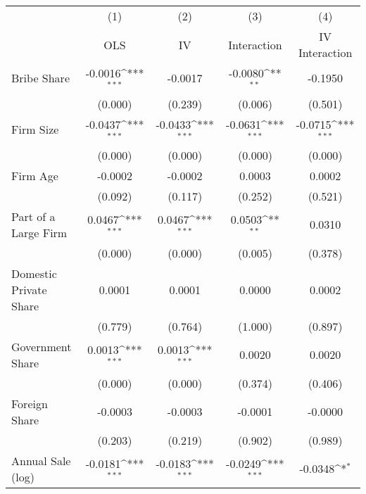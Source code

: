 {
\def\sym#1{\ifmmode^{#1}\else\(^{#1}\)\fi}
\begin{tabular}{l*{4}{c}}
\hline\hline
                    &\multicolumn{1}{c}{(1)}         &\multicolumn{1}{c}{(2)}         &\multicolumn{1}{c}{(3)}         &\multicolumn{1}{c}{(4)}         \\
                    &         OLS         &          IV         & Interaction         &IV Interaction         \\
\hline
Bribe Share         &     -0.0016\sym{***}&     -0.0017         &     -0.0080\sym{**} &     -0.1950         \\
                    &     (0.000)         &     (0.239)         &     (0.006)         &     (0.501)         \\
Firm Size           &     -0.0437\sym{***}&     -0.0433\sym{***}&     -0.0631\sym{***}&     -0.0715\sym{***}\\
                    &     (0.000)         &     (0.000)         &     (0.000)         &     (0.000)         \\
Firm Age            &     -0.0002         &     -0.0002         &      0.0003         &      0.0002         \\
                    &     (0.092)         &     (0.117)         &     (0.252)         &     (0.521)         \\
Part of a Large Firm&      0.0467\sym{***}&      0.0467\sym{***}&      0.0503\sym{**} &      0.0310         \\
                    &     (0.000)         &     (0.000)         &     (0.005)         &     (0.378)         \\
Domestic Private Share&      0.0001         &      0.0001         &      0.0000         &      0.0002         \\
                    &     (0.779)         &     (0.764)         &     (1.000)         &     (0.897)         \\
Government Share    &      0.0013\sym{***}&      0.0013\sym{***}&      0.0020         &      0.0020         \\
                    &     (0.000)         &     (0.000)         &     (0.374)         &     (0.406)         \\
Foreign Share       &     -0.0003         &     -0.0003         &     -0.0001         &     -0.0000         \\
                    &     (0.203)         &     (0.219)         &     (0.902)         &     (0.989)         \\
Annual Sale (log)   &     -0.0181\sym{***}&     -0.0183\sym{***}&     -0.0249\sym{***}&     -0.0348\sym{*}  \\

\end{tabular}}
